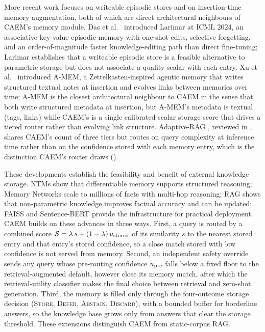 More recent work focuses on writeable episodic stores and on insertion-time memory augmentation, both of which are direct architectural neighbours of CAEM's memory module. Das et al.~\cite{larimar2024das} introduced Larimar at ICML 2024, an associative key-value episodic memory with one-shot edits, selective forgetting, and an order-of-magnitude faster knowledge-editing path than direct fine-tuning; Larimar establishes that a writeable episodic store is a feasible alternative to parametric storage but does not associate a quality scalar with each entry. Xu et al.~\cite{xu2025amem} introduced A-MEM, a Zettelkasten-inspired agentic memory that writes structured textual notes at insertion and evolves links between memories over time; A-MEM is the closest architectural neighbour to CAEM in the sense that both write structured metadata at insertion, but A-MEM's metadata is textual (tags, links) while CAEM's is a single calibrated scalar storage score that drives a tiered router rather than evolving link structure. Adaptive-RAG \cite{jeong2024adaptive}, reviewed in , shares CAEM's count of three tiers but routes on query complexity at inference time rather than on the confidence stored with each memory entry, which is the distinction CAEM's router draws ().

These developments establish the feasibility and benefit of external knowledge storage. NTMs show that differentiable memory supports structured reasoning; Memory Networks scale to millions of facts with multi-hop reasoning; RAG shows that non-parametric knowledge improves factual accuracy and can be updated; FAISS and Sentence-BERT provide the infrastructure for practical deployment. CAEM builds on these advances in three ways. First, a query is routed by a combined score $\mathcal{S} = \lambda\, s + (1-\lambda)\, u_{\text{stored}}$ of its similarity $s$ to the nearest stored entry and that entry's stored confidence, so a close match stored with low confidence is not served from memory. Second, an independent safety override sends any query whose pre-routing confidence $u_{\text{pre}}$ falls below a fixed floor to the retrieval-augmented default, however close its memory match, after which the retrieval-utility classifier makes the final choice between retrieval and zero-shot generation. Third, the memory is filled only through the four-outcome storage decision (\textsc{Store}, \textsc{Defer}, \textsc{Abstain}, \textsc{Discard}), with a bounded buffer for borderline answers, so the knowledge base grows only from answers that clear the storage threshold. These extensions distinguish CAEM from static-corpus RAG.

